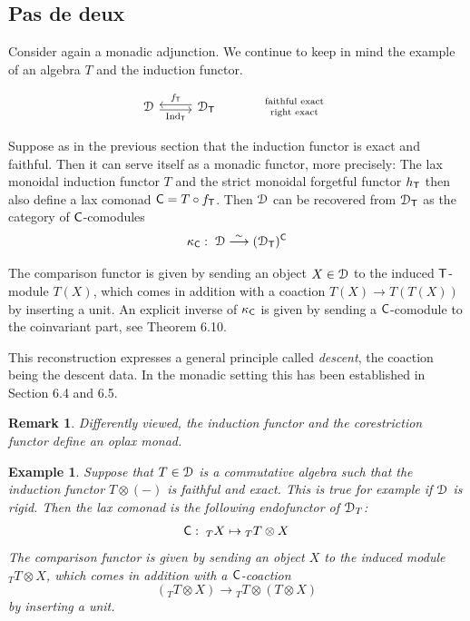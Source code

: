 \documentclass[a4paper, reqno]{amsart}
\newtheorem{example}[theorem]{Example}
\newtheorem{remark}[theorem]{Remark}
\theoremstyle{introTheorems}
\renewcommand{\1}{\mathbbold{1}}
\begin{document}
\subsection{Pas de deux}\label{sec_deux}

Consider again a monadic adjunction. We continue to keep in mind the example of an algebra $T$ and the induction functor.

\[\begin{tikzcd}[row sep=6ex, column sep=6ex]
\renewcommand{\arraystretch}{0.7}
\catD
\arrow[r, leftarrow, shift right=-2pt,"\forget_\monT"]
\arrow[r, rightarrow, swap,shift right=2pt,"\funT"]
& 
\catD_\monT
&
\begin{array}{c}
    \scriptstyle \textnormal{faithful exact}\\
    \scriptstyle \textnormal{right exact} \\
\end{array}
\end{tikzcd}\]

Suppose as in the previous section that the induction functor is exact and faithful. Then it can serve itself as a monadic functor, more precisely: The lax monoidal induction functor $T$ and the strict monoidal forgetful functor $h_{\mathsf{T}}$ then also define a lax comonad $\mathsf{C}=T\circ f_{\mathsf{T}}$. Then $\mathcal{D}$ can be recovered from $\mathcal{D}_{\mathsf{T}}$ as the category of $\mathsf{C}$-comodules 
%
$$\kappa_{\mathsf{C}}:\;\mathcal{D}\stackrel{\sim}{\longrightarrow} (\mathcal{D}_{\mathsf{T}})^{\mathsf{C}}$$

The comparison functor is given by sending an object $X\in \mathcal{D}$ to the induced ${\mathsf{T}}$-module $T(X)$, which comes in addition with a coaction  
$T(X)\to T(T(X))$ by inserting a unit. An explicit inverse of $\kappa_{\mathsf{C}}$ is given by sending a $\mathsf{C}$-comodule to the coinvariant part, see \cite{BLV11} Theorem 6.10.

This reconstruction expresses a general principle called \emph{descent}, the coaction being the descent data. In the monadic setting this has been established in \cite{BLV11} Section 6.4 and 6.5.



\begin{remark}
Differently viewed, the induction functor and the corestriction functor define an oplax monad. 
\end{remark}

\begin{example}
Suppose that $T\in\mathcal{D}$ is a commutative algebra such that the induction functor $T\otimes (-)$ is faithful and exact. This is true for example if $\mathcal{D}$ is rigid.  
Then the lax comonad is the following endofunctor of $\mathcal{D}_T$:
$$ \mathsf{C}:\; {_T}X\mapsto {_T}T\otimes X$$
The comparison functor is given by sending an object $X$ to the induced module ${_T}T\otimes X$, which comes in addition with a $\mathsf{C}$-coaction
$$({_T}T\otimes X)
\to {_T}T\otimes (T\otimes X)$$
by inserting a unit. 
\end{example}
\end{document}
